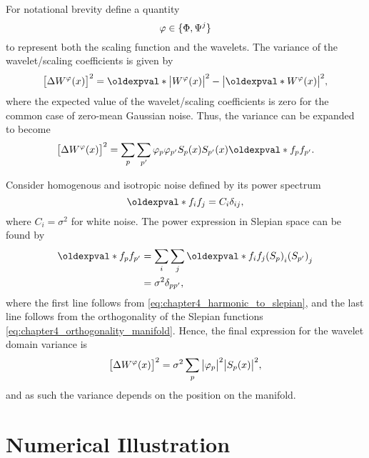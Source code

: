 For notational brevity define a quantity
%
\begin{equation}
	\varphi \in \{\Phi,\Psi^{j}\}
\end{equation}
%
to represent both the scaling function and the wavelets.
The variance of the wavelet/scaling coefficients is given by
%
\begin{equation}
	\variance{\mesh{W^{\varphi}}}
	= \expval{\abs{\mesh{W^{\varphi}}}^{2}}
	-\abs{\expval{\mesh{W^{\varphi}}}}^{2},
\end{equation}
%
where the expected value of the wavelet/scaling coefficients is zero for the common case of zero-mean Gaussian noise.
Thus, the variance can be expanded to become
%
\begin{equation}\label{eq:chapter4_slepian_isotropic_noise}
	\variance{\mesh{W^{\varphi}}}
	= \slepianSum \slepianSum['] \slepian{\varphi} \slepian[']{\varphi} \mesh{\slepian{S}} \mesh{\slepian[']{S}} \expval{\slepian{f} \slepian[']{f}}.
\end{equation}

Consider homogenous and isotropic noise defined by its power spectrum
%
\begin{equation}
	\expval{f_{i} f_{j}}
	= C_{i} \delta_{ij},
\end{equation}
%
where \(C_{i} = \sigma^{2}\) for white noise.
The power expression in Slepian space can be found by
%
\begin{align}
	\expval{\slepian{f} \slepian[']{f}}
	 & = \sum\limits_{i} \sum\limits_{j} \expval{f_{i} f_{j}} \empty{} {(\slepian{S})}_{i} {(\slepian[']{S})}_{j} \nonumber \\
	 & = \sigma^{2} \delta_{pp'},
\end{align}
%
where the first line follows from \cref{eq:chapter4_harmonic_to_slepian}, and the last line follows from the orthogonality of the Slepian functions \cref{eq:chapter4_orthogonality_manifold}.
Hence, the final expression for the wavelet domain variance is
%
\begin{equation}
	{\big[\Delta W^{\varphi}(x)\big]}^{2}
	= \sigma^{2} \sum\limits_{p} \big\lvert{\varphi}_{p}\big\rvert^{2} \big\lvert{S}_{p}(x)\big\rvert^{2},
\end{equation}
%
and as such the variance depends on the position on the manifold.

\section{Numerical Illustration}


















